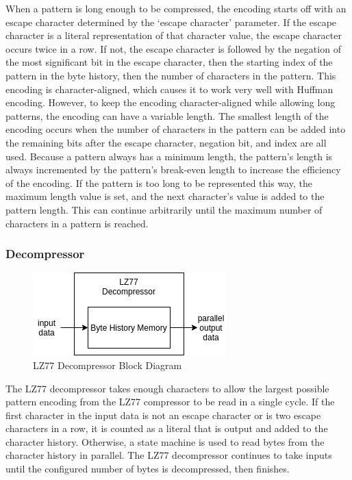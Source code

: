 \documentclass[doublespace,nopageskip]{VTthesis}
\begin{document}
When a pattern is long enough to be compressed, the encoding starts off with an escape character determined by the `escape character' parameter. If the escape character is a literal representation of that character value, the escape character occurs twice in a row. If not, the escape character is followed by the negation of the most significant bit in the escape character, then the starting index of the pattern in the byte history, then the number of characters in the pattern. This encoding is character-aligned, which causes it to work very well with Huffman encoding. However, to keep the encoding character-aligned while allowing long patterns, the encoding can have a variable length. The smallest length of the encoding occurs when the number of characters in the pattern can be added into the remaining bits after the escape character, negation bit, and index are all used. Because a pattern always has a minimum length, the pattern's length is always incremented by the pattern's break-even length to increase the efficiency of the encoding. If the pattern is too long to be represented this way, the maximum length value is set, and the next character's value is added to the pattern length. This can continue arbitrarily until the maximum number of characters in a pattern is reached. 

\subsubsection{Decompressor}\label{sss:lz77_decompressor_implementation}

\begin{figure}[htb]
	\centering
	\includegraphics[scale=1]{LZ77 Decompressor.png}
	\caption{LZ77 Decompressor Block Diagram}
	\label{fig:lz77_decompressor_block_diagram}
\end{figure}

The LZ77 decompressor takes enough characters to allow the largest possible pattern encoding from the LZ77 compressor to be read in a single cycle. If the first character in the input data is not an escape character or is two escape characters in a row, it is counted as a literal that is output and added to the character history. Otherwise, a state machine is used to read bytes from the character history in parallel. The LZ77 decompressor continues to take inputs until the configured number of bytes is decompressed, then finishes.
\end{document}
